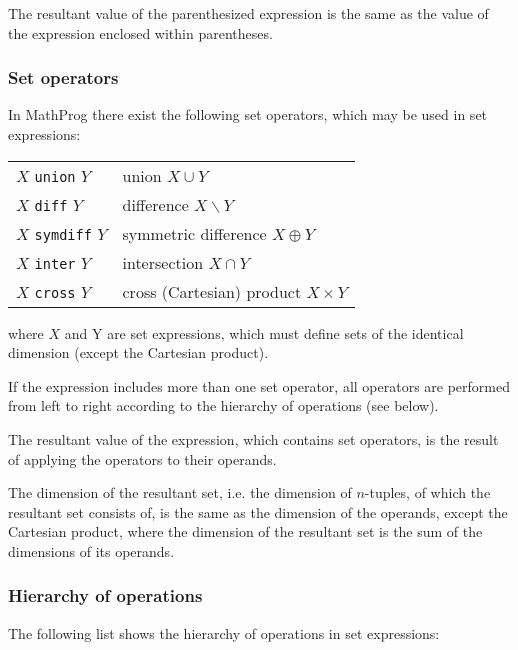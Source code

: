 \documentclass[10pt]{article}
\begin{document}
The resultant value of the parenthesized expression is the same as the
value of the expression enclosed within parentheses.

\subsubsection{Set operators}

In MathProg there exist the following set operators, which may be used
in set expressions:

\medskip

\begin{tabular}{@{}p{96pt}p{222pt}@{}}
$X$ {\tt union} $Y$&union $X\cup Y$\\
$X$ {\tt diff} $Y$&difference $X\backslash Y$\\
$X$ {\tt symdiff} $Y$&symmetric difference $X\oplus Y$\\
$X$ {\tt inter} $Y$&intersection $X\cap Y$\\
$X$ {\tt cross} $Y$&cross (Cartesian) product $X\times Y$\\
\end{tabular}

\medskip

\noindent where $X$ and Y are set expressions, which must define sets
of the identical dimension (except the Cartesian product).

If the expression includes more than one set operator, all operators
are performed from left to right according to the hierarchy of
operations (see below).

The resultant value of the expression, which contains set operators, is
the result of applying the operators to their operands.

The dimension of the resultant set, i.e. the dimension of $n$-tuples,
of which the resultant set consists of, is the same as the dimension of
the operands, except the Cartesian product, where the dimension of the
resultant set is the sum of the dimensions of its operands.

\subsubsection{Hierarchy of operations}

The following list shows the hierarchy of operations in set
expressions:

\medskip
\end{document}
